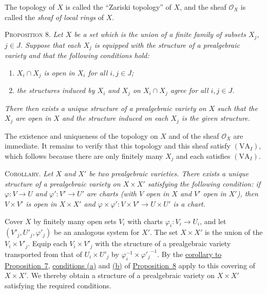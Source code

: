 The topology of $X$ is called the ``Zariski topology'' of $X$, and the sheaf $\mathcal{O}_X$ is called the \textit{sheaf of local rings} of $X$.

\label{fac:II:1:no:34:prop:8}
\textsc{Proposition 8.} \textit{Let $X$ be a set which is the union of a finite family of subsets $X_j$, $j\in J$. Suppose that each $X_j$ is equipped with the structure of a prealgebraic variety and that the following conditions hold:}

\begin{enumerate}[label=(\alph*),leftmargin=2.5em]
\item{}\label{fac:II:1:no:34:prop:8:item:a} \textit{$X_i\cap X_j$ is open in $X_i$ for all $i,j\in J$;}
\item{}\label{fac:II:1:no:34:prop:8:item:b} \textit{the structures induced by $X_i$ and $X_j$ on $X_i\cap X_j$ agree for all $i,j\in J$.}
\end{enumerate}

\textit{There then exists a unique structure of a prealgebraic variety on $X$ such that the $X_j$ are open in $X$ and the structure induced on each $X_j$ is the given structure.}

The existence and uniqueness of the topology on $X$ and of the sheaf $\mathcal{O}_X$ are immediate. It remains to verify that this topology and this sheaf satisfy \hyperref[fac:II:1:no:34:axiom:VA-I]{$(\mathrm{VA}_I)$}, which follows because there are only finitely many $X_j$ and each satisfies \hyperref[fac:II:1:no:34:axiom:VA-I]{$(\mathrm{VA}_I)$}.

\label{fac:II:1:no:34:cor:prop:8}
\textsc{Corollary.} \textit{Let $X$ and $X'$ be two prealgebraic varieties. There exists a unique structure of a prealgebraic variety on $X\times X'$ satisfying the following condition: if $\varphi:V\to U$ and $\varphi':V'\to U'$ are charts (with $V$ open in $X$ and $V'$ open in $X'$), then $V\times V'$ is open in $X\times X'$ and $\varphi\times\varphi':V\times V'\to U\times U'$ is a chart.}

Cover $X$ by finitely many open sets $V_i$ with charts $\varphi_i:V_i\to U_i$, and let $(V'_j,U'_j,\varphi'_j)$ be an analogous system for $X'$. The set $X\times X'$ is the union of the $V_i\times V'_j$. Equip each $V_i\times V'_j$ with the structure of a prealgebraic variety transported from that of $U_i\times U'_j$ by $\varphi_i^{-1}\times{\varphi'_j}^{-1}$. By the \hyperref[fac:II:1:no:33:cor:prop:7]{corollary to Proposition~7}, \hyperref[fac:II:1:no:34:prop:8:item:a]{conditions (a)} and \hyperref[fac:II:1:no:34:prop:8:item:b]{(b)} of \hyperref[fac:II:1:no:34:prop:8]{Proposition~8} apply to this covering of $X\times X'$. We thereby obtain a structure of a prealgebraic variety on $X\times X'$ satisfying the required conditions.

